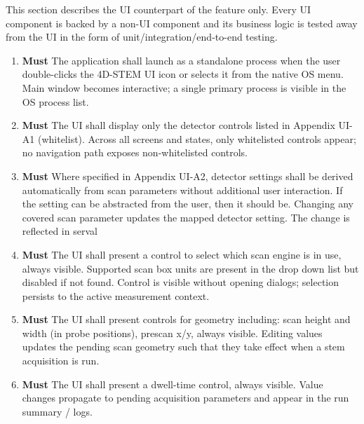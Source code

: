 \documentclass[10pt]{article}
\newcommand{\PriorityTag}[2]{%
  \colorbox{#2!25}{\footnotesize\textsf{\textbf{#1}}}\hspace{0.6em}}
\newcommand{\must}{\leavevmode\PriorityTag{Must}{green}}
\newcounter{reqgrp}[section] %
\newcounter{reqno}
\newcommand{\reqprefix}{GEN}
\newenvironment{requirements}[1]{%
  \renewcommand{\reqprefix}{#1}%
  \refstepcounter{reqgrp}%
  \setcounter{reqno}{0}%
  \begin{enumerate}[leftmargin=*]
}{\end{enumerate}}
\begin{document}
This section describes the UI counterpart of the feature only. Every UI component is backed by a non-UI component and its business logic is tested away from the UI in the form of unit/integration/end-to-end testing.

\begin{requirements}{UI}

  \item \must {}
  {The application shall launch as a standalone process when the user double-clicks the 4D-STEM UI icon or selects it from the native OS menu.}
  {Main window becomes interactive; a single primary process is visible in the OS process list.}

  \item \must {}
  { The UI shall display only the detector controls listed in Appendix UI-A1 (whitelist).}
  {Across all screens and states, only whitelisted controls appear; no navigation path exposes non-whitelisted controls.}

  \item \must {}
  { Where specified in Appendix UI-A2, detector settings shall be derived automatically from scan parameters without additional user interaction. If the setting can be abstracted from the user, then it should be.}
  {Changing any covered scan parameter updates the mapped detector setting. The change is reflected in serval}

  \item \must {}
  {The UI shall present a control to select which scan engine is in use, always visible. Supported scan box units are present in the drop down list but disabled if not found.}
  {Control is visible without opening dialogs; selection persists to the active measurement context.}

  \item \must {}
  {The UI shall present controls for geometry including: scan height and width (in probe positions), prescan x/y, always visible.}
  {Editing values updates the pending scan geometry such that they take effect when a stem acquisition is run.}

  \item \must {}
  {The UI shall present a dwell-time control, always visible.}
  {Value changes propagate to pending acquisition parameters and appear in the run summary / logs.}


\end{requirements}
\end{document}
